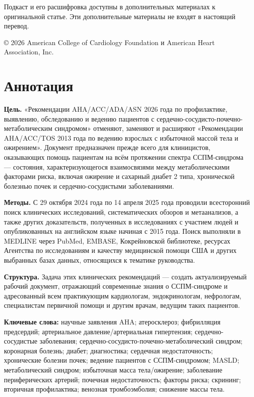 \documentclass[11pt,a4paper]{article}
\begin{document}
Подкаст и его расшифровка доступны в дополнительных материалах к оригинальной статье. Эти дополнительные материалы не входят в настоящий перевод.

© 2026 American College of Cardiology Foundation и American Heart Association, Inc.

\section*{Аннотация}
\textbf{Цель.} «Рекомендации AHA/ACC/ADA/ASN 2026 года по профилактике, выявлению, обследованию и ведению пациентов с сердечно-сосудисто-почечно-метаболическим синдромом» отменяют, заменяют и расширяют «Рекомендации AHA/ACC/TOS 2013 года по ведению взрослых с избыточной массой тела и ожирением». Документ предназначен прежде всего для клиницистов, оказывающих помощь пациентам на всём протяжении спектра ССПМ-синдрома --- состояния, характеризующегося взаимосвязями между метаболическими факторами риска, включая ожирение и сахарный диабет 2 типа, хронической болезнью почек и сердечно-сосудистыми заболеваниями.

\textbf{Методы.} С 29 октября 2024 года по 14 апреля 2025 года проводили всесторонний поиск клинических исследований, систематических обзоров и метаанализов, а также других доказательств, полученных в исследованиях с участием людей и опубликованных на английском языке начиная с 2015 года. Поиск выполняли в MEDLINE через PubMed, EMBASE, Кокрейновской библиотеке, ресурсах Агентства по исследованиям и качеству медицинской помощи США и других выбранных базах данных, относящихся к тематике руководства.

\textbf{Структура.} Задача этих клинических рекомендаций --- создать актуализируемый рабочий документ, отражающий современные знания о ССПМ-синдроме и адресованный всем практикующим кардиологам, эндокринологам, нефрологам, специалистам первичной помощи и другим врачам, ведущим таких пациентов.

\textbf{Ключевые слова:} научные заявления AHA; атеросклероз; фибрилляция предсердий; артериальное давление/артериальная гипертензия; сердечно-сосудистые заболевания; сердечно-сосудисто-почечно-метаболический синдром; коронарная болезнь; диабет; диагностика; сердечная недостаточность; хронические болезни почек; ведение пациентов с ССПМ-синдромом; MASLD; метаболический синдром; избыточная масса тела/ожирение; заболевание периферических артерий; почечная недостаточность; факторы риска; скрининг; вторичная профилактика; венозная тромбоэмболия; снижение массы тела.
\end{document}
